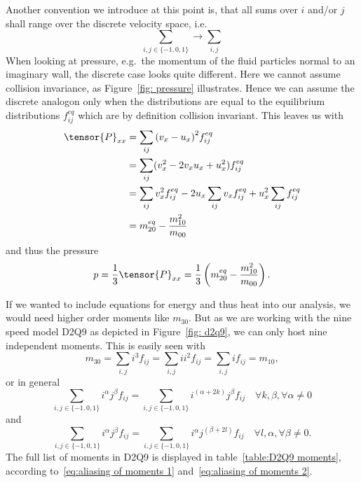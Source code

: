 Another convention we introduce at this point is, that all sums over $i$ and/or $j$ shall range over the discrete velocity space, i.e.
\begin{equation*}
  \sum_{i,j \in \{-1,0,1\}} \rightarrow \sum_{i,j}
\end{equation*}
When looking at pressure, e.g.\ the momentum of the fluid particles normal to an imaginary wall, the discrete case looks quite different.
Here we cannot assume collision invariance, as Figure~\ref{fig: pressure} illustrates.
Hence we can assume the discrete analogon only when the distributions are equal to the equilibrium distributions $f_{ij}^{eq}$ which are by definition collision invariant.
This leaves us with
\begin{equation}
  \begin{aligned}
    \tensor{P}_{xx}
    & = \sum_{ij} {(v_x - u_x)}^2 f_{ij}^{eq}
    \\ & =
    \sum_{ij} (v_x^2 - 2v_x u_x + u_x^2) f_{ij}^{eq}
    \\ & =
    \sum_{ij} v_x^2 f_{ij}^{eq} - 2 u_x \sum_{ij} v_x f_{ij}^{eq} + u_x^2 \sum_{ij}f_{ij}^{eq}
    \\ & = m_{20}^{eq} - \frac{m_{10}^2}{m_{00}}
  \end{aligned}
\end{equation}
and thus the pressure
\begin{equation}
  p=\frac{1}{3} \tensor{P}_{xx} = \frac{1}{3} \left(m_{20}^{eq} - \frac{m_{10}^2}{m_{00}}\right).
\end{equation}

If we wanted to include equations for energy and thus heat into our analysis, we would need higher order moments like $m_{30}$.
But as we are working with the nine speed model D2Q9 as depicted in Figure~\ref{fig: d2q9}, we can only host nine independent moments.
This is easily seen with
\begin{equation}
  m_{30} = \sum_{i,j} i^3 f_{ij} = \sum_{i,j} i i^2 f_{ij} = \sum_{i,j} i f_{ij} = m_{10},
\end{equation}
or in general
\begin{equation}
  \label{eq:aliasing of moments 1}
  \sum_{i,j \in \{-1,0,1\}} i^\alpha j^\beta f_{ij} = \sum_{i,j \in \{-1,0,1\}} i^{(\alpha+2k)} j^\beta f_{ij} \quad \forall k,\beta, \forall \alpha \neq 0
\end{equation}
and
\begin{equation}
  \label{eq:aliasing of moments 2}
  \sum_{i,j \in \{-1,0,1\}} i^\alpha j^\beta f_{ij} = \sum_{i,j \in \{-1,0,1\}} i^\alpha j^{(\beta+2l)} f_{ij} \quad \forall l, \alpha, \forall \beta \neq 0.
\end{equation}
The full list of moments in D2Q9 is displayed in table~\ref{table:D2Q9 moments}, according to~\eqref{eq:aliasing of moments 1} and~\eqref{eq:aliasing of moments 2}.

